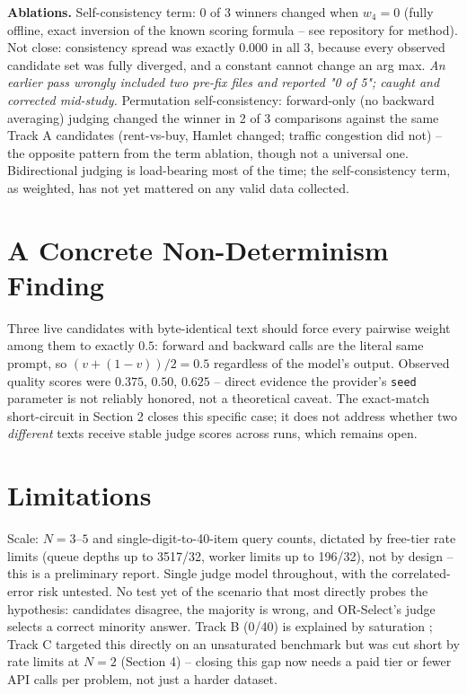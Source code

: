 \documentclass{article}
\begin{document}
\textbf{Ablations.} Self-consistency term: 0 of 3 winners changed when
$w_4{=}0$ (fully offline, exact inversion of the known scoring formula --
see repository for method). Not close: consistency spread was exactly
0.000 in all 3, because every observed candidate set was fully diverged,
and a constant cannot change an arg max. \emph{An earlier pass wrongly
included two pre-fix files and reported "0 of 5"; caught and corrected
mid-study.} Permutation
self-consistency: forward-only (no backward averaging) judging changed
the winner in 2 of 3 comparisons against the same Track A candidates
(rent-vs-buy, Hamlet changed; traffic congestion did not) -- the
opposite pattern from the term ablation, though not a universal one.
Bidirectional judging is load-bearing most of the time; the
self-consistency term, as weighted, has not yet mattered on any valid
data collected.

\section{A Concrete Non-Determinism Finding}
\label{sec:finding}

Three live candidates with byte-identical text should force every
pairwise weight among them to exactly $0.5$: forward and backward calls
are the literal same prompt, so $(v+(1-v))/2=0.5$ regardless of the
model's output. Observed quality scores were $0.375$, $0.50$, $0.625$ --
direct evidence the provider's \texttt{seed} parameter is not reliably
honored, not a theoretical caveat. The exact-match short-circuit in
Section 2 closes this specific case; it does not address whether two
\emph{different} texts receive stable judge scores across runs, which
remains open.

\section{Limitations}

Scale: $N{=}3$--$5$ and single-digit-to-40-item query counts, dictated by
free-tier rate limits (queue depths up to 3517/32, worker limits up to
196/32), not by design -- this is a preliminary report. Single judge
model throughout, with the correlated-error risk
\citep{correlatederrors2026} untested. No test yet of the scenario that
most directly probes the hypothesis: candidates disagree, the majority
is wrong, and OR-Select's judge selects a correct minority answer.
Track B (0/40) is explained by saturation
\citep{kim2025correlated,ding2026agree}; Track C targeted this directly
on an unsaturated benchmark but was cut short by rate limits at $N{=}2$
(Section 4) -- closing this gap now needs a paid tier or fewer API calls
per problem, not just a harder dataset.
\end{document}
